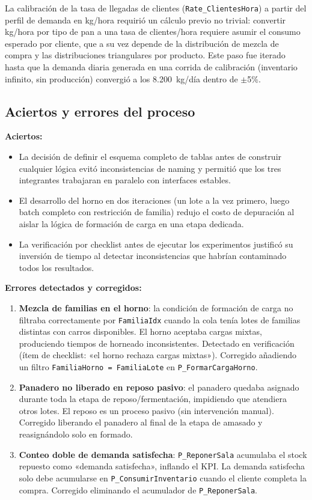 \documentclass[12pt]{article}
\begin{document}
La calibración de la tasa de llegadas de clientes (\texttt{Rate\_ClientesHora}) a partir del perfil de demanda en kg/hora requirió un cálculo previo no trivial: convertir kg/hora por tipo de pan a una tasa de clientes/hora requiere asumir el consumo esperado por cliente, que a su vez depende de la distribución de mezcla de compra y las distribuciones triangulares por producto. Este paso fue iterado hasta que la demanda diaria generada en una corrida de calibración (inventario infinito, sin producción) convergió a los 8.200~kg/día dentro de $\pm$5\%.

\subsection{Aciertos y errores del proceso}

\textbf{Aciertos:}
\begin{itemize}
  \item La decisión de definir el esquema completo de tablas antes de construir cualquier lógica evitó inconsistencias de naming y permitió que los tres integrantes trabajaran en paralelo con interfaces estables.
  \item El desarrollo del horno en dos iteraciones (un lote a la vez primero, luego batch completo con restricción de familia) redujo el costo de depuración al aislar la lógica de formación de carga en una etapa dedicada.
  \item La verificación por checklist antes de ejecutar los experimentos justificó su inversión de tiempo al detectar inconsistencias que habrían contaminado todos los resultados.
\end{itemize}

\textbf{Errores detectados y corregidos:}
\begin{enumerate}
  \item \textbf{Mezcla de familias en el horno}: la condición de formación de carga no filtraba correctamente por \texttt{FamiliaIdx} cuando la cola tenía lotes de familias distintas con carros disponibles. El horno aceptaba cargas mixtas, produciendo tiempos de horneado inconsistentes. Detectado en verificación (ítem de checklist: «el horno rechaza cargas mixtas»). Corregido añadiendo un filtro \texttt{FamiliaHorno = FamiliaLote} en \texttt{P\_FormarCargaHorno}.
  \item \textbf{Panadero no liberado en reposo pasivo}: el panadero quedaba asignado durante toda la etapa de reposo/fermentación, impidiendo que atendiera otros lotes. El reposo es un proceso pasivo (sin intervención manual). Corregido liberando el panadero al final de la etapa de amasado y reasignándolo solo en formado.
  \item \textbf{Conteo doble de demanda satisfecha}: \texttt{P\_ReponerSala} acumulaba el stock repuesto como «demanda satisfecha», inflando el KPI. La demanda satisfecha solo debe acumularse en \texttt{P\_ConsumirInventario} cuando el cliente completa la compra. Corregido eliminando el acumulador de \texttt{P\_ReponerSala}.
\end{enumerate}
\end{document}

